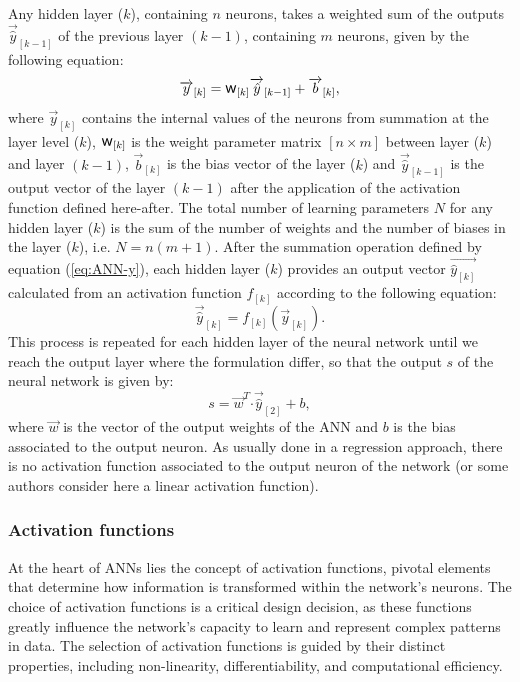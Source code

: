 \documentclass[algorithms,article,submit,pdftex,moreauthors]{Definitions/mdpi}
\DeclareRobustCommand{\w}{\mbox{\large\ensuremath{\mathsf{w}}}}
\DeclareRobustCommand{\dotp}{\boldsymbol{\cdot}}
\DeclareRobustCommand{\lay}[1]{_{[#1]}}
\begin{document}
Any hidden layer ($k$), containing $n$ neurons, takes a weighted sum of the outputs $\overrightarrow{\hat{y}}\lay{k-1}$ of the previous layer $(k-1)$, containing $m$ neurons, given by the following equation:
\begin{equation}
\overrightarrow{y}\lay{k} = \w\lay{k} \overrightarrow{\hat{y}}\lay{k-1}+ \overrightarrow{b}\lay{k}\label{eq:ANN-y},
\end{equation}
where $\overrightarrow{y}\lay{k}$ contains the internal values of the neurons from summation at the layer level ($k$), $\w\lay{k}$ is the weight parameter matrix $[n\times m]$ between layer ($k$) and layer $(k-1)$, $\overrightarrow{b}\lay{k}$ is the bias vector of the layer ($k$) and $\overrightarrow{\hat{y}}\lay{k-1}$ is the output vector of the layer $(k-1)$ after the application of the activation function defined here-after.
The total number of learning parameters $N$ for any hidden layer ($k$) is the sum of the number of weights and the number of biases in the layer ($k$), i.e. $N=n(m+1)$.
After the summation operation defined by equation (\ref{eq:ANN-y}), each hidden layer ($k$) provides an output vector $\overrightarrow{\hat{y}\lay{k}}$ calculated from an activation function $f\lay{k}$ according to the following equation:
\begin{equation}
\overrightarrow{\hat{y}}\lay{k}=f\lay{k}(\overrightarrow{y}\lay{k}).
\label{eq:ANN-f}
\end{equation}
This process is repeated for each hidden layer of the neural network until we reach the output layer where the formulation differ, so that the output $s$ of the neural network is given by:
\begin{equation}
s = \overrightarrow{w}^T \dotp \overrightarrow{\hat{y}}\lay{2} + b\label{eq:ANN-s},
\end{equation}
where $\overrightarrow{w}$ is the vector of the output weights of the ANN and $b$ is the bias associated to the output neuron.
As usually done in a regression approach, there is no activation function associated to the output neuron of the network (or some authors consider here a linear activation function).

\subsubsection{Activation functions}\label{subsubsec:ANN-act}

At the heart of ANNs lies the concept of activation functions, pivotal elements that determine how information is transformed within the network's neurons.
The choice of activation functions is a critical design decision, as these functions greatly influence the network's capacity to learn and represent complex patterns in data.
The selection of activation functions is guided by their distinct properties, including non-linearity, differentiability, and computational efficiency.
\end{document}
